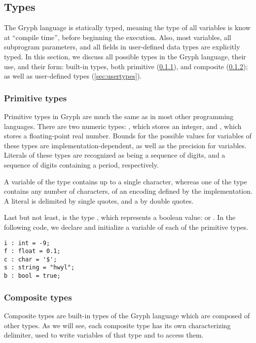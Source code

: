 \subsection{Types}
\label{sec:types}
The Gryph language is statically typed, meaning the type of all variables is know at ``compile time'', before beginning the execution. Also, most variables, all subprogram parameters, and all fields in user-defined data types are explicitly typed. In this section, we discuss all possible types in the Gryph language, their use, and their form: built-in types, both primitive (\ref{sec:primitive}), and composite (\ref{sec:composite}); as well as user-defined types (\ref{sec:usertypes}).
\subsubsection{Primitive types}
\label{sec:primitive}
Primitive types in Gryph are much the same as in most other programming languages. There are two numeric types: , which stores an integer, and , which stores a floating-point real number. Bounds for the possible values for variables of these types are implementation-dependent, as well as the precision for  variables. Literals of these types are recognized as being a sequence of digits, and a sequence of digits containing a period, respectively.

A variable of the  type contains up to a single character, whereas one of the  type contains any number of characters, of an encoding defined by the implementation. A  literal is delimited by single quotes, and a  by double quotes. 

Last but not least, is the type , which represents a boolean value:  or . In the following code, we declare and initialize a variable of each of the primitive types.
\begin{lstlisting}[language=Gryph]
i : int = -9;
f : float = 0.1;
c : char = '$';
s : string = "hwyl";
b : bool = true;
\end{lstlisting}

\subsubsection{Composite types}
\label{sec:composite}
Composite types are built-in types of the Gryph language which are composed of other types. As we will see, each composite type has its own characterizing delimiter, used to write variables of that type and to access them.


